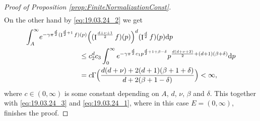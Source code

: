 \documentclass[11pt,a4paper]{article}
\theoremstyle{plain}
\theoremstyle{definition}
\theoremstyle{remark}
\newcommand{\dd}{{\rm d}}
\newcommand{\frI}{\mathop{\mathrm{I}}\nolimits}
\begin{document}
\begin{proof}[Proof of Proposition \ref{prop:FiniteNormalizationConst}]
\begin{align}
    \end{align}
    On the other hand by \eqref{eq:19.03.24_2} we get
    \begin{align*}
        \int_{A}^\infty &e^{-\gamma\pi^{\frac{d}{2}}(\frI^{\frac{d}{2}+1}f)(p)} \Big((\frI^{{d+\nu+1\over 2}}f)(p)\Big)^d(\frI^{{d\over 2}}f)(p) \dd p \\
        &\hspace{2cm}\le c_2^dc_3\int_{0}^{\infty} e^{-\gamma\pi^{\frac{d}{2}}c_1 p^{\frac{d}{2}+1+\beta-\delta}}p^{\frac{d(d+\nu+2)}{2}+(d+1)(\beta+\delta)}\dd p\\
        &\hspace{2cm}=c\Gamma\Big(\frac{d(d+\nu)+2(d+1)(\beta+1+\delta)}{d+2(\beta+1-\delta)}\Big)<\infty,
    \end{align*}
    where $c\in(0,\infty)$ is some constant depending on $A$, $d$, $\nu$, $\beta$ and $\delta$. This together with \eqref{eq:19.03.24_3} and \eqref{eq:19.03.24_1}, where in this case $E=(0,\infty)$, finishes the proof.


\end{proof}
\end{document}
